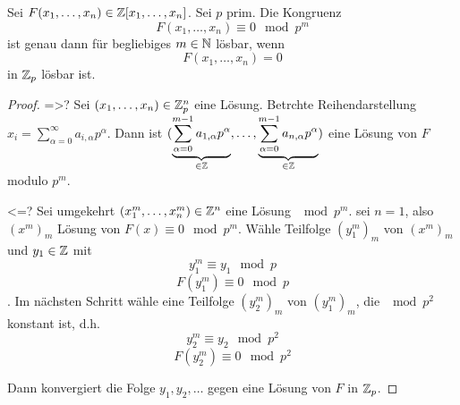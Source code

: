 \documentclass[../main.tex]{subfiles}
\begin{document}
\begin{theorem} %
    Sei $F(x_1,\dots, x_n)\in \mathbb{Z}[x_1,\dots,x_n]$.
    Sei $p$ prim. Die Kongruenz $$F(x_1,\dots,x_n) \equiv 0\mod p^m$$
    ist genau dann für begliebiges $m \in \mathbb{N}$ lösbar, wenn $$F(x_1,\dots,x_n)=0$$ in $\mathbb{Z}_p$ lösbar ist.
\end{theorem}
\begin{proof}
    =>?
    Sei $(x_1,\dots,x_n)\in \mathbb{Z}_p^n$ eine Lösung. 
    Betrchte Reihendarstellung $x_i=\sum_{\alpha=0}^\infty a_{i,\alpha} p^\alpha$.
    Dann ist $(\underbrace{\sum_{\alpha =0}^{m-1} a_{1,\alpha} p^\alpha}_{\in\mathbb{Z}}, \dots,\underbrace{\sum_{\alpha = 0}^{m-1} a_{n,\alpha}p^\alpha}_{\in\mathbb{Z}})$
    eine Lösung von $F$ modulo $p^m$.

    <=?
    Sei umgekehrt $(x_1^m, \dots, x_n^m) \in \mathbb{Z}^n$ eine Lösung $\mod p^m$.
    \obda sei $n=1$, also $(x^m)_m$ Lösung von $F(x) \equiv 0\mod p^m$.
    Wähle Teilfolge $(y_1^m)_m$ von $(x^m)_m$ und $y_1\in \mathbb{Z}$ mit $$y_1^m \equiv y_1\mod p$$
    $$F(y_1^m)\equiv 0 \mod p$$.
    Im nächsten Schritt wähle eine Teilfolge $(y_2^m)_m$ von $(y_1^m)_m$, die $\mod p^2$ konstant ist, d.h. $$y_2^m\equiv y_2\mod p^2$$
    $$F(y_2^m) \equiv 0\mod p^2$$

    Dann konvergiert die Folge $y_1,y_2,\dots$ gegen eine Lösung von $F$ in $\mathbb{Z}_p$.
\end{proof}

\end{document}
